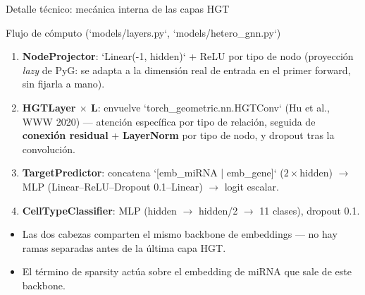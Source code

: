 \begin{frame}{Detalle t\'ecnico: mec\'anica interna de las capas HGT}
  \small
  \begin{block}{Flujo de c\'omputo}
    \scriptsize (`models/layers.py`, `models/hetero\_gnn.py`) \small
    \begin{enumerate}
      \item \textbf{NodeProjector}: `Linear(-1, hidden)` + ReLU por tipo de nodo (proyecci\'on \emph{lazy} de PyG: se adapta a la dimensi\'on real de entrada en el primer forward, sin fijarla a mano).
      \item \textbf{HGTLayer $\times$ L}: envuelve `torch\_geometric.nn.HGTConv` (Hu et al., WWW 2020) --- atenci\'on espec\'ifica por tipo de relaci\'on, seguida de \textbf{conexi\'on residual} + \textbf{LayerNorm} por tipo de nodo, y dropout tras la convoluci\'on.
      \item \textbf{TargetPredictor}: concatena `[emb\_miRNA | emb\_gene]` ($2\times$hidden) $\to$ MLP (Linear--ReLU--Dropout 0.1--Linear) $\to$ logit escalar.
      \item \textbf{CellTypeClassifier}: MLP (hidden $\to$ hidden/2 $\to$ 11 clases), dropout 0.1.
    \end{enumerate}
  \end{block}

  \begin{itemize}
    \item Las dos cabezas comparten el mismo backbone de embeddings --- no hay ramas separadas antes de la \'ultima capa HGT.
    \item El t\'ermino de sparsity act\'ua sobre el embedding de miRNA que sale de este backbone.
  \end{itemize}
\end{frame}

